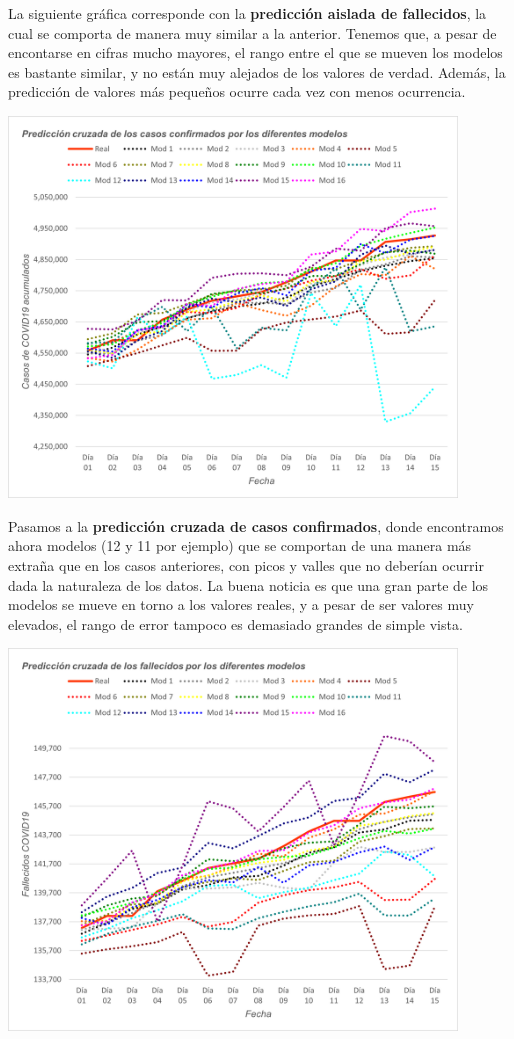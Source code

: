 \documentclass[12pt,a4paper, xcolor=table]{article}
\begin{document}
            La siguiente gráfica corresponde con la \textbf{predicción aislada de fallecidos}, la cual se comporta de manera muy similar a la anterior. Tenemos que, a pesar de encontarse en cifras mucho mayores, el rango entre el que se mueven los modelos es bastante similar, y no están muy alejados de los valores de verdad. Además, la predicción de valores más pequeños ocurre cada vez con menos ocurrencia.

            \begin{center}
                \centering
                \includegraphics[width=450px]{img/pred_c_conf_BZ.png}
            \end{center}

            Pasamos a la \textbf{predicción cruzada de casos confirmados}, donde encontramos ahora modelos (12 y 11 por ejemplo) que se comportan de una manera más extraña que en los casos anteriores, con picos y valles que no deberían ocurrir dada la naturaleza de los datos. La buena noticia es que una gran parte de los modelos se mueve en torno a los valores reales, y a pesar de ser valores muy elevados, el rango de error tampoco es demasiado grandes de simple vista.

            \begin{center}
                \centering
                \includegraphics[width=450px]{img/pred_c_fall_BZ.png}
            \end{center}
\end{document}
